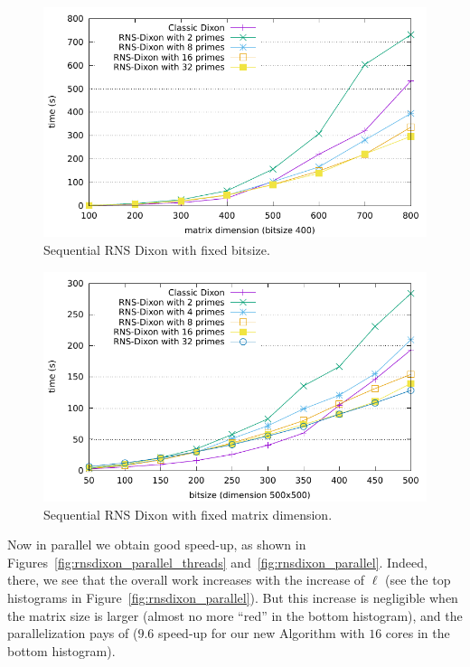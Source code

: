 \begin{figure}[htb]
\begin{center}
  \includegraphics[width=.8\textwidth]{Pictures/RNSDixon/sequential-primesCount}
\end{center}
\caption{Sequential RNS Dixon with fixed bitsize.}\label{fig:rnsdixon_seqprimescount}
\end{figure}
\begin{figure}[htb]
\begin{center}
  \includegraphics[width=.8\textwidth]{Pictures/RNSDixon/sequential-bitsize}
\end{center}
\caption{Sequential RNS Dixon with fixed matrix dimension.}\label{fig:rnsdixon_seqbitsize}
\end{figure}

Now in parallel we obtain good speed-up, as shown in
Figures~\ref{fig:rnsdixon_parallel_threads}
and~\ref{fig:rnsdixon_parallel}. Indeed, there, we see that the
overall work increases with the increase of $\ell$ (see the top
histograms in Figure~\ref{fig:rnsdixon_parallel}).
But this increase is negligible when the matrix size is larger (almost
no more ``red'' in the bottom histogram), and the parallelization pays
of ($9.6$ speed-up for our new Algorithm with $16$ cores in the bottom
histogram).

